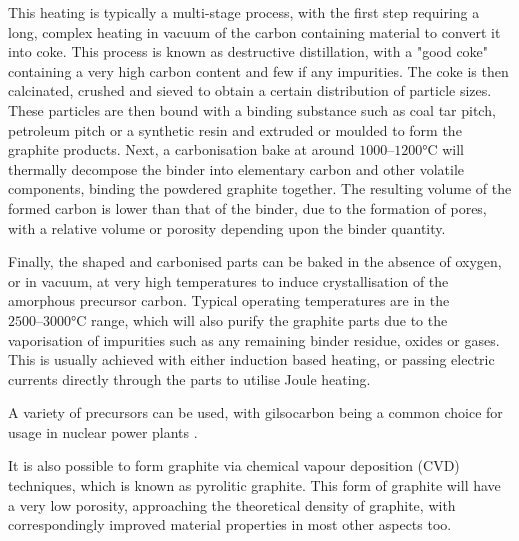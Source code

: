 This heating is typically a multi-stage process, with the first step requiring a long, complex heating in vacuum of the carbon containing material to convert it into coke. This process is known as destructive distillation, with a "good coke" containing a very high carbon content and few if any impurities. The coke is then calcinated, crushed and sieved to obtain a certain distribution of particle sizes. These particles are then bound with a binding substance such as coal tar pitch, petroleum pitch or a synthetic resin and extruded or moulded to form the graphite products. Next, a carbonisation bake at around $1000\text{--}1200\si{\degreeCelsius}$ will thermally decompose the binder into elementary carbon and other volatile components, binding the powdered graphite together. The resulting volume of the formed carbon is lower than that of the binder, due to the formation of pores, with a relative volume or porosity depending upon the binder quantity.

Finally, the shaped and carbonised parts can be baked in the absence of oxygen, or in vacuum, at very high temperatures to induce crystallisation of the amorphous precursor carbon. Typical operating temperatures are in the $2500\text{--}3000\si{\degreeCelsius}$ range, which will also purify the graphite parts due to the vaporisation of impurities such as any remaining binder residue, oxides or gases. This is usually achieved with either induction based heating, or passing electric currents directly through the parts to utilise Joule heating.

A variety of precursors can be used, with gilsocarbon being a common choice for usage in nuclear power plants \cite{liu2017}.

It is also possible to form graphite via chemical vapour deposition (CVD) techniques, which is known as pyrolitic graphite. This form of graphite will have a very low porosity, approaching the theoretical density of graphite, with correspondingly improved material properties in most other aspects too.

